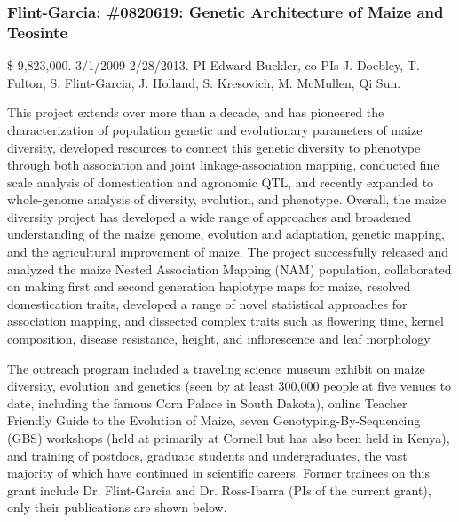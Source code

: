 \subsubsection*{Flint-Garcia: \#0820619: Genetic Architecture of Maize and Teosinte}
\$ 9,823,000. 3/1/2009-2/28/2013. PI Edward Buckler, co-PIs J. Doebley, T. Fulton, S. Flint-Garcia, J. Holland, S. Kresovich, M. McMullen, Qi Sun. 
\par{}  This project extends over more than a decade, and has pioneered the characterization of population genetic and evolutionary parameters of maize diversity, developed resources to connect this genetic diversity to phenotype through both association and joint linkage-association mapping, conducted fine scale analysis of domestication and agronomic QTL, and recently expanded to whole-genome analysis of diversity, evolution, and phenotype. Overall, the maize diversity project has developed a wide range of approaches and broadened understanding of the maize genome, evolution and adaptation, genetic mapping, and the agricultural improvement of maize. The project successfully released and analyzed the maize Nested Association Mapping (NAM) population, collaborated on making first and second generation haplotype maps for maize, resolved domestication traits, developed a range of novel statistical approaches for association mapping, and dissected complex traits such as flowering time, kernel composition, disease resistance, height, and inflorescence and leaf morphology. 
\par{} The outreach program included a traveling science museum exhibit on maize diversity, evolution and genetics (seen by at least 300,000 people at five venues to date, including the famous Corn Palace in South Dakota), online Teacher Friendly Guide to the Evolution of Maize, seven Genotyping-By-Sequencing (GBS) workshops (held at primarily at Cornell but has also been held in Kenya), and training of postdocs, graduate students and undergraduates, the vast majority of which have continued in scientific careers.  Former trainees on this grant include Dr. Flint-Garcia  and Dr. Ross-Ibarra  (PIs of the current grant), only their publications are shown below.
\par{} \citet{Buckler2009, Flint-Garcia2009, Flint-Garcia2009a, Flint-Garcia2009b, Gore2009, McMullen2009, Ross-Ibarra2009a, Bottoms2010, Dubois2010, Zhang2010a, vanheerwaarden2010a, vanheerwaarden2010b, Brown2011b, Morrell2011a, Studer2011b, vanheerwaarden2011a, Tian2011, Chia2012a, Cook2012a, Fang2012a, Hufford2012b, Hung2012, Hung2012a, Romay2013}
